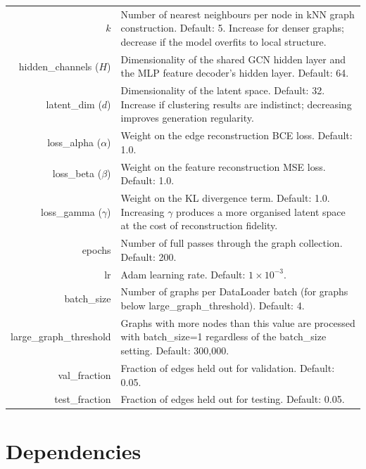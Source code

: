 \documentclass[11pt]{article}
\begin{document}
\begin{table}[H]
\begin{tabular}{ r p{} }
$k$
& Number of nearest neighbours per node in kNN graph
construction. Default: 5. Increase for denser graphs; decrease
if the model overfits to local structure. \\

hidden\_channels ($H$)
& Dimensionality of the shared GCN hidden layer and the MLP feature
decoder's hidden layer. Default: 64. \\

latent\_dim ($d$)
& Dimensionality of the latent space. Default: 32. Increase if
clustering results are indistinct; decreasing improves generation
regularity. \\

loss\_alpha ($\alpha$)
& Weight on the edge reconstruction BCE loss. Default: 1.0. \\

loss\_beta ($\beta$)
& Weight on the feature reconstruction MSE loss. Default: 1.0. \\

loss\_gamma ($\gamma$)
& Weight on the KL divergence term. Default: 1.0. Increasing $\gamma$
produces a more organised latent space at the cost of reconstruction
fidelity. \\

epochs
& Number of full passes through the graph collection. Default: 200. \\

lr
& Adam learning rate. Default: $1 \times 10^{-3}$. \\

batch\_size
& Number of graphs per DataLoader batch (for graphs below
large\_graph\_threshold). Default: 4. \\

large\_graph\_threshold
& Graphs with more nodes than this value are processed with
batch\_size=1 regardless of the batch\_size setting. Default:
300,000. \\

val\_fraction
& Fraction of edges held out for validation. Default: 0.05. \\

test\_fraction
& Fraction of edges held out for testing. Default: 0.05.
\end{tabular}
\end{table}


\section{Dependencies}
\end{document}
